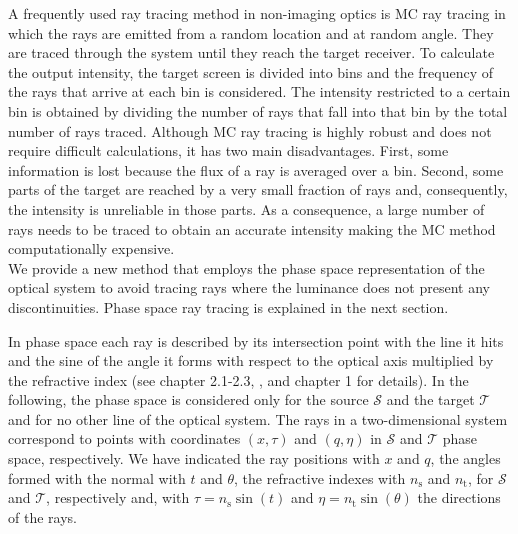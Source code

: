 \indent A frequently used ray tracing method in non-imaging optics is MC ray tracing \cite{Ting:1} in which the rays are emitted from a random location and at random angle. They are traced through the system until they reach the target receiver. To calculate the output intensity, the target screen is divided into bins and the frequency of the rays that arrive at each bin is considered. The intensity restricted to a certain bin is obtained by dividing the number of rays that fall into that bin by the total number of rays traced.
Although MC ray tracing is highly robust and does not require difficult calculations, it has two main disadvantages.
First, some information is lost because the flux of a ray is averaged over a bin.
Second, some parts of the target are reached by a very small fraction of rays and, consequently, the intensity is unreliable in those parts.
As a consequence, a large number of rays needs to be traced to obtain an accurate intensity making the MC method computationally expensive.
\\
\indent We provide a new method that employs the phase space representation of the optical system to avoid tracing rays where the luminance does not present any discontinuities.
Phase space ray tracing is explained in the next section.

In phase space each ray is described by its intersection point with the line it hits and the sine of the angle it forms with respect to the optical axis multiplied by the refractive index (see \cite{wolf2004geometric} chapter 2.1-2.3, \cite{rausch2014phase}, and \cite{torre2005linear} chapter 1 for details).
In the following, the phase space is considered only for the source $\mathcal{S}$ and the target $\mathcal{T}$ and for no other line of the optical system.
The rays in a two-dimensional system correspond to points with coordinates $(x,\tau)$ and $(q,\eta)$ in $\mathcal{S}$ and $\mathcal{T}$ phase space, respectively.
We have indicated the ray positions with $x$ and $q$, the angles formed with the normal with $t$ and $\theta$, the refractive indexes with $n_{\textrm{s}}$ and $n_{\textrm{t}}$, for $\mathcal{S}$ and $\mathcal{T}$, respectively and, with $\tau = n_{\textrm{s}}\sin(t)$ and $\eta = n_{\textrm{t}}\sin(\theta)$ the directions of the rays.


